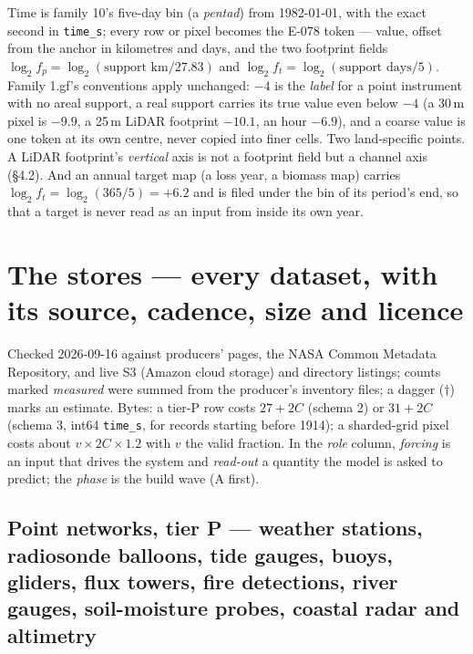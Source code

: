 \documentclass[10pt]{article}
\newcommand{\code}[1]{\texttt{#1}}
\begin{document}
Time is family 10's five-day bin (a \emph{pentad}) from 1982-01-01, with the exact second in
\code{time\_s}; every row or pixel becomes the E-078 token --- value, offset
from the anchor in kilometres and days, and the two footprint fields
$\log_2 f_p = \log_2(\text{support km}/27.83)$ and
$\log_2 f_t = \log_2(\text{support days}/5)$. Family 1.gf's conventions
apply unchanged: $-4$ is the \emph{label} for a point instrument with no
areal support, a real support carries its true value even below $-4$ (a
30\,m pixel is $-9.9$, a 25\,m LiDAR footprint $-10.1$, an hour $-6.9$), and
a coarse value is one token at its own centre, never copied into finer
cells. Two land-specific points. A LiDAR footprint's \emph{vertical} axis is
not a footprint field but a channel axis (\S4.2). And an annual target map
(a loss year, a biomass map) carries $\log_2 f_t = \log_2(365/5) = +6.2$ and
is filed under the bin of its period's end, so that a target is never read
as an input from inside its own year.

\section{The stores --- every dataset, with its source, cadence, size and licence}

Checked 2026-09-16 against producers' pages, the NASA Common Metadata
Repository, and live S3 (Amazon cloud storage) and directory listings; counts marked
\emph{measured} were summed from the producer's inventory files; a dagger
($\dagger$) marks an estimate. Bytes: a tier-P row costs $27 + 2C$ (schema
2) or $31 + 2C$ (schema 3, int64 \code{time\_s}, for records starting before
1914); a sharded-grid pixel costs about $v \times 2C \times 1.2$ with $v$
the valid fraction. In the \emph{role} column, \emph{forcing} is an input that drives the system and \emph{read-out} a quantity the model is asked to predict; the \emph{phase} is the build wave (A first).

\subsection{Point networks, tier P --- weather stations, radiosonde balloons, tide gauges, buoys, gliders, flux towers, fire detections, river gauges, soil-moisture probes, coastal radar and altimetry}
\end{document}
